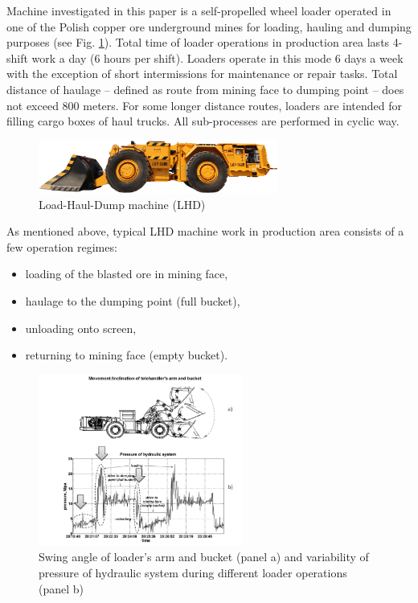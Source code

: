 \documentclass{webofc}
\begin{document}
Machine investigated in this paper is a self-propelled wheel loader operated in one of the Polish copper ore underground mines for loading, hauling and dumping purposes (see Fig. \ref{LHD_machine}). Total time of loader operations in production area lasts 4-shift work a day (6 hours per shift). Loaders operate in this mode 6 days a week with the exception of short intermissions for maintenance or repair tasks. Total distance of haulage -- defined as route from mining face to dumping point -- does not exceed 800 meters. For some longer distance routes, loaders are intended for filling cargo boxes of haul trucks. All sub-processes are performed in cyclic way.

\begin{figure}[ht!]
\centering
\includegraphics[width=0.7\textwidth,clip]{loader_fig}
\caption{Load-Haul-Dump machine (LHD)}
\label{LHD_machine}       %
\vspace*{-0.7cm}
\end{figure}

As mentioned above, typical LHD machine work in production area consists of a few operation regimes:

\begin{itemize}
    \item   loading of the blasted ore in mining face,
    \item haulage to the dumping point (full bucket),
    \item   unloading onto screen,
    \item returning to mining face (empty bucket).
\end{itemize}


\begin{figure}[ht!]
\centering
\includegraphics[width=0.6\textwidth,clip]{fig}
\caption{Swing angle of loader’s arm and bucket (panel a) and variability of pressure of hydraulic system during different loader operations (panel b)}
\label{subplot_machine_signal}       %
\vspace*{-0.7cm}
\end{figure}
\end{document}
